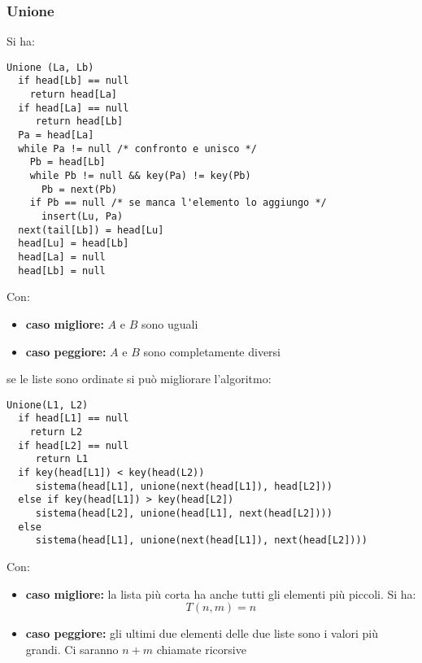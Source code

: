 \documentclass[a4paper,12pt,oneside,tikz]{book}
\begin{document}
\subsubsection{Unione}
Si ha:
\begin{verbatim}
Unione (La, Lb)
  if head[Lb] == null
    return head[La]
  if head[La] == null
     return head[Lb]
  Pa = head[La]
  while Pa != null /* confronto e unisco */
    Pb = head[Lb]
    while Pb != null && key(Pa) != key(Pb)
      Pb = next(Pb)
    if Pb == null /* se manca l'elemento lo aggiungo */
      insert(Lu, Pa)
  next(tail[Lb]) = head[Lu]
  head[Lu] = head[Lb]
  head[La] = null
  head[Lb] = null
\end{verbatim}
Con:
\begin{itemize}
	\item \textbf{caso migliore:} $A$ e $B$ sono uguali
	\item \textbf{caso peggiore:} $A$ e $B$ sono completamente diversi
\end{itemize}
\newpage
se le liste sono ordinate si può migliorare l'algoritmo:
\begin{verbatim}
Unione(L1, L2)
  if head[L1] == null
    return L2
  if head[L2] == null
     return L1
  if key(head[L1]) < key(head(L2))
     sistema(head[L1], unione(next(head[L1]), head[L2]))
  else if key(head[L1]) > key(head[L2])
     sistema(head[L2], unione(head[L1], next(head[L2])))
  else
     sistema(head[L1], unione(next(head[L1]), next(head[L2])))
\end{verbatim}
Con:
\begin{itemize}
	\item \textbf{caso migliore:} la lista più corta ha anche tutti gli elementi più piccoli. Si ha:
	      $$T(n,m)=n$$
	\item \textbf{caso peggiore:} gli ultimi due elementi delle due liste sono i valori più grandi. Ci saranno $n+m$ chiamate ricorsive
\end{itemize}
\end{document}
